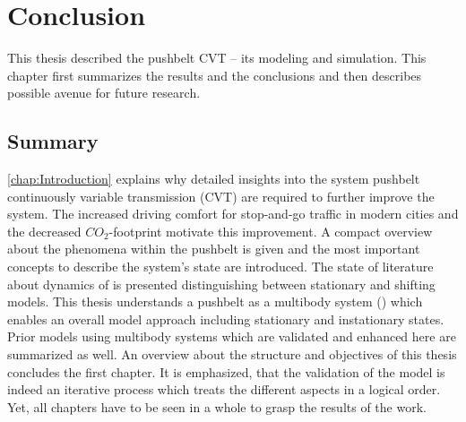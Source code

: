 \chapter{Conclusion} \label{chap:Conclusion}

This thesis described the pushbelt CVT -- its modeling and simulation. 
This chapter first summarizes the results and the conclusions and then describes possible avenue for future research.

\section{Summary}

\cref{chap:Introduction} explains why detailed insights into the system pushbelt continuously variable transmission (CVT) are required to further improve the system. 
The increased driving comfort for stop-and-go traffic in modern cities and the decreased $CO_2$-footprint motivate this improvement. 
A compact overview about the phenomena within the pushbelt is given and the most important concepts to describe the system's state are introduced. 
The state of literature about dynamics of \CVTs is presented distinguishing between stationary and shifting models. 
This thesis understands a pushbelt \CVT as a multibody system (\MBS) which enables an overall model approach including stationary and instationary states. 
Prior models using multibody systems which are validated and enhanced here are summarized as well. 
An overview about the structure and objectives of this thesis concludes the first chapter. 
It is emphasized, that the validation of the model is indeed an iterative process which treats the different aspects in a logical order. 
Yet, all chapters have to be seen in a whole to grasp the results of the work.\par

